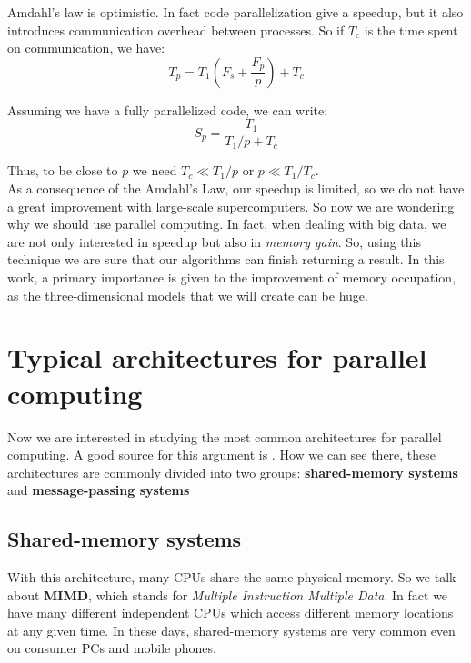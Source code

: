 Amdahl's law is optimistic. In fact code parallelization give a speedup, but it also introduces communication overhead between processes. So if $T_{c}$ is the time spent on communication, we have:
\begin{equation}
 T_{p} = T_{1}(F_{s} + \frac{F_{p}}{p}) +  T_{c}
\end{equation}

Assuming we have a fully parallelized code, we can write:
\begin{equation}
 S_{p} = \frac{T_{1}}{T_{1}/p + T_{c}}
\end{equation}

Thus, to be close to $p$ we need $T_{c} \ll T_{1}/p$ or $p \ll T_{1}/T_{c}$.\\

As a consequence of the Amdahl's Law, our speedup is limited, so we do not have a great improvement with large-scale supercomputers. So now we are wondering why we should use parallel computing. In fact, when dealing with big data, we are not only interested in speedup but also in \textit{memory gain}. So, using this technique we are sure that our algorithms can finish returning a result. In this work, a primary importance is given to the improvement of memory occupation, as the three-dimensional models that we will create can be huge.

\section{Typical architectures for parallel computing}\label{sec22:parallelArchitectures}

Now we are interested in studying the most common architectures for parallel computing. A good source for this argument is \cite{Matloff}. How we can see there, these architectures are commonly divided into two groups: \textbf{shared-memory systems} and \textbf{message-passing systems}

\subsection{Shared-memory systems}

With this architecture, many CPUs share the same physical memory. So we talk about \textbf{MIMD}, which stands for \textit{Multiple Instruction Multiple Data}. In fact we have many different independent CPUs which access different memory locations at any given time. In these days, shared-memory systems are very common even on consumer PCs and mobile phones.\\

